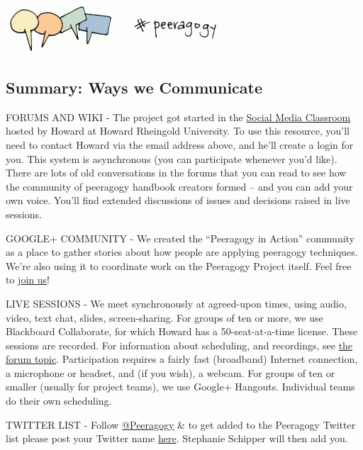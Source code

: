 \begin{center}
\href{http://peeragogy.org/wp-content/uploads/2012/03/communicate\_color1.gif}{\includegraphics[width=.9\textwidth]{../pictures/communicate.jpg}}
\end{center}

\subsection{Summary: Ways we Communicate}

FORUMS AND WIKI - The project got started in the
\href{http://socialmediaclassroom.com/host/peeragogy/wiki/main-page}{Social
Media Classroom} hosted by Howard at Howard Rheingold University. To use
this resource, you'll need to contact Howard via the email address
above, and he'll create a login for you. This system is asynchronous
(you can participate whenever you'd like). There are lots of old
conversations in the forums that you can read to see how the community
of peeragogy handbook creators formed -- and you can add your own voice.
You'll find extended discussions of issues and decisions raised in live
sessions.

GOOGLE+ COMMUNITY - We created the ``Peeragogy in Action'' community as
a place to gather stories about how people are applying peeragogy
techniques. We're also using it to coordinate work on the Peeragogy
Project itself. Feel free to
j\href{https://plus.google.com/u/0/communities/107386162349686249470}{oin
us}!

LIVE SESSIONS - We meet synchronously at agreed-upon times, using audio,
video, text chat, slides, screen-sharing. For groups of ten or more, we
use Blackboard Collaborate, for which Howard has a 50-seat-at-a-time
license. These sessions are recorded. For information about scheduling,
and recordings, see
\href{http://socialmediaclassroom.com/host/peeragogy/forum/live-sessions-schedule-recordings-notes-mindmaps}{the
forum topic}. Participation requires a fairly fast (broadband) Internet
connection, a microphone or headset, and (if you wish), a webcam. For
groups of ten or smaller (usually for project teams), we use Google+
Hangouts. Individual teams do their own scheduling.

TWITTER LIST - Follow \href{http://twitter.com/Peeragogy/}{@Peeragogy}
\& to get added to the Peeragogy Twitter list please post your Twitter
name
\href{http://socialmediaclassroom.com/host/peeragogy/forum/the-tools-we-are-using-and-how-access-them}{here}.
Stephanie Schipper will then add you.

